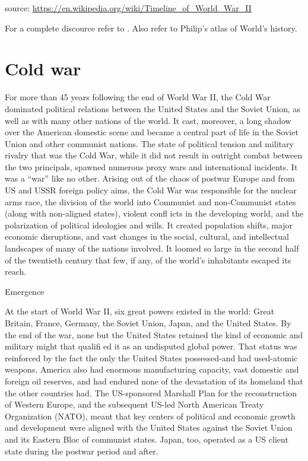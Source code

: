 \documentclass[
  openany]{book}
\begin{document}
source: \url{https://en.wikipedia.org/wiki/Timeline_of_World_War_II}

For a complete discource refer to \citet{woodruff2016concise}. Also refer to Philip's atlas of World's history.

\hypertarget{cold-war}{%
\section{Cold war}\label{cold-war}}

For more than 45 years following the end of World War II, the Cold War dominated political relations between the United States and the Soviet Union, as well as with many other nations of the world. It cast, moreover, a long shadow over the American domestic scene and became a central part of life in the Soviet Union and other communist nations. The state of political tension and military rivalry that was the Cold War, while it did not result in outright combat between the two principals, spawned numerous proxy wars and international incidents. It was a ``war'' like no other. Arising out of the chaos of postwar Europe and from US and USSR foreign policy aims, the Cold War was responsible for the nuclear arms race, the division of the world into Communist and non-Communist states (along with non-aligned states), violent confl icts in the developing world, and the polarization of political ideologies and wills. It created population shifts, major economic disruptions, and vast changes in the social, cultural, and intellectual landscapes of many of the nations involved. It loomed so large in the second half of the twentieth century that few, if any, of the world's inhabitants escaped its reach.

Emergence

At the start of World War II, six great powers existed in the world: Great Britain, France, Germany, the Soviet Union, Japan, and the United States. By the end of the war, none but the United States retained the kind of economic and military might that qualifi ed it as an undisputed global power. That status was reinforced by the fact the only the United States possessed-and had used-atomic weapons. America also had enormous manufacturing capacity, vast domestic and foreign oil reserves, and had endured none of the devastation of its homeland that the other countries had. The US-sponsored Marshall Plan for the reconstruction of Western Europe, and the subsequent US-led North American Treaty Organization (NATO), meant that key centers of political and economic growth and development were aligned with the United States against the Soviet Union and its Eastern Bloc of communist states. Japan, too, operated as a US client state during the postwar period and after.
\end{document}
